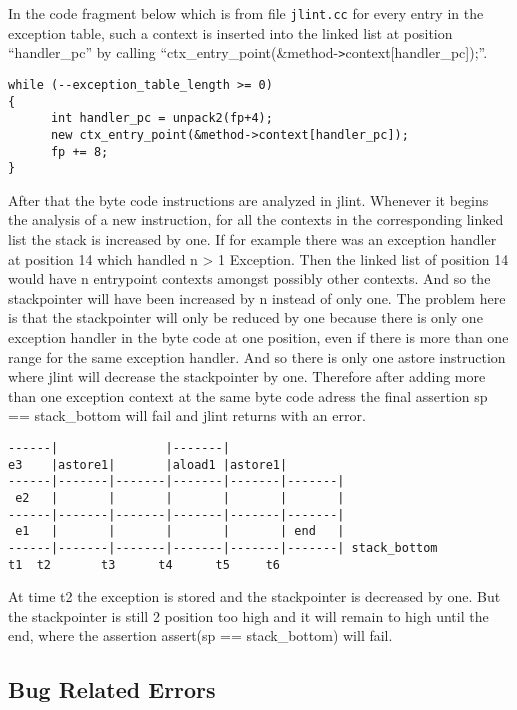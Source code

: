 \documentclass[11pt,twoside,a4paper,draft]{article}
\begin{document}
In the code fragment below which is from file \texttt{jlint.cc} for 
every entry in the exception table, such a context is inserted into the linked list
at position ``handler\_pc'' by calling ``ctx\_entry\_point(\&method-\verb+>+context[handler\_pc]);''.
\begin{verbatim}
while (--exception_table_length >= 0)
{ 
      int handler_pc = unpack2(fp+4);
      new ctx_entry_point(&method->context[handler_pc]); 
      fp += 8;
}
\end{verbatim}
After that the byte code instructions are analyzed in jlint. Whenever it begins the
analysis of a new instruction, for all the contexts in the corresponding linked list
the stack is increased by one. If for example there was an exception handler at position 14
which handled n > 1 Exception. Then the linked list of position 14 would have n entrypoint
contexts amongst possibly other contexts. And so the stackpointer will have been increased by n 
instead of only one. The problem here is that the stackpointer will only be reduced by one
because there is only one exception handler in the byte code at one position, even if there is more
than one range for the same exception handler. And so there is only one astore instruction
where jlint will decrease the stackpointer by one. Therefore after adding more than one
exception context at the same byte code adress the final assertion sp == stack\_bottom
will fail and jlint returns with an error.

\begin{verbatim}
------|               |-------|
e3    |astore1|       |aload1 |astore1|
------|-------|-------|-------|-------|-------|
 e2   |       |       |       |       |       |
------|-------|-------|-------|-------|-------|
 e1   |       |       |       |       | end   |
------|-------|-------|-------|-------|-------| stack_bottom
t1	t2       t3      t4      t5     t6
\end{verbatim}


At time t2 the exception is stored and the stackpointer is decreased by one. But
the stackpointer is still 2 position too high and it will remain to high
until the end, where the assertion assert(sp == stack\_bottom) will fail.

\subsection {Bug Related Errors}
\end{document}
